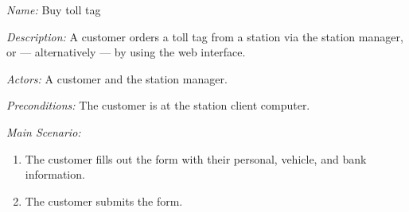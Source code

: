 \textit {Name: } Buy toll tag

\textit {Description: } A customer orders a toll tag from a station via the station manager, or --- alternatively --- by using the web interface.

\textit {Actors: } A customer and the station manager.

\textit {Preconditions: } The customer is at the station client computer.

\textit{Main Scenario: }

\begin{enumerate}
	\item The customer fills out the form with their personal, vehicle, and bank information. 
	\item The customer submits the form.
\end{enumerate}